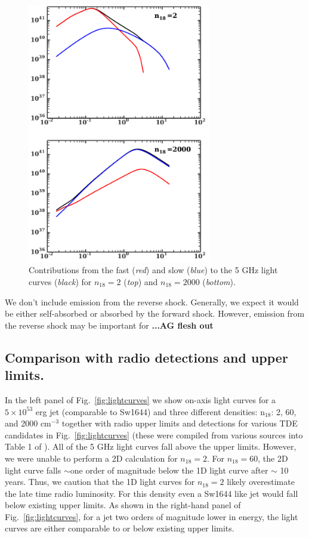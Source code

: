 \documentclass[usenatbib,fleqn]{mnras}
\begin{document}
\begin{figure}
\includegraphics[width=8cm]{components.pdf}
\caption{\label{fig:components} Contributions from the fast
  (\textit{red}) and slow (\textit{blue}) to the 5 GHz light curves
  (\textit{black}) for $n_{18}=2$ (\textit{top}) and $n_{18}=2000$
  (\textit{bottom}).}
\end{figure}

We don't include emission from the reverse
shock. Generally, we expect it would be either self-absorbed or
absorbed by the forward shock. However, emission from the reverse
shock may be important for \textbf{...AG flesh out} 

\subsection{Comparison with radio detections and upper limits.}

In the left panel of Fig.~\ref{fig:lightcurves} we show on-axis light
curves for a $5\times 10^{53}$ erg jet (comparable to Sw1644) and three
different densities: n$_{18}$: 2, 60, and 2000 cm$^{-3}$ together
with radio upper limits and detections for various TDE candidates in
Fig.~\ref{fig:lightcurves} (these were compiled from various sources
into Table 1 of \citealt{Mimica+2015}).  All of the 5 GHz light curves
fall above the upper limits. However, we were unable to perform a 2D
calculation for $n_{18}=2$.  For $n_{18}=60$, the 2D light curve falls
$\sim$one order of magnitude below the 1D light curve after $\sim$ 10
years. Thus, we caution that the 1D light curves for $n_{18}=2$ likely
overestimate the late time radio luminosity. For this density even a
Sw1644 like jet would fall below existing upper limits. As shown in
the right-hand panel of Fig.~\ref{fig:lightcurves}, for a jet two
orders of magnitude lower in energy, the light curves are either
comparable to or below existing upper limits.
\end{document}
